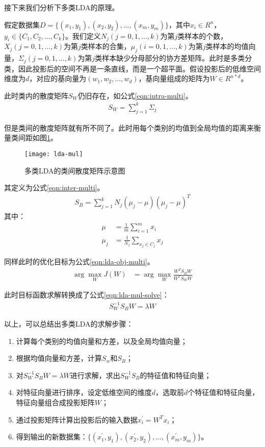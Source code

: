 接下来我们分析下多类LDA的原理。

假定数据集$D=\{(x_1, y_1), (x_2, y_2), ..., (x_m, y_m)\}$，其中$x_i \in R^{n}$，$y_i \in \{C_1, C_2, ..., C_k\}$。我们定义$N_j (j=0,1,...,k)$为第$j$类样本的个数，$X_j (j=0,1,...,k)$为第$j$类样本的合集，$\mu_j (i=0,1,...,k)$为第$j$类样本的均值向量，$\Sigma_j (j=0,1,...,k)$为第$j$类样本缺少分母部分的协方差矩阵。此时是多类分类，因此投影后的空间不再是一条直线，而是一个超平面。假设投影后的低维空间维度为$d$，对应的基向量为$(w_1, w_2,..., w_d)$，基向量组成的矩阵为$W\in{R^{n*d}}$。

此时类内的散度矩阵$S_W$仍旧存在，如公式\ref{eqn:intra-multi}。
\begin{align}
\label{eqn:intra-multi}
S_W = \sum_{j=1}^{k} \Sigma_{j} 
\end{align}

但是类间的散度矩阵就有所不同了。此时用每个类别的均值到全局均值的距离来衡量类间距如图\ref{fig:lda-mul}。
\begin{figure}[htbp]
  \centering
  \texttt{[image: lda-mul]}
  \caption{多类LDA的类间散度矩阵示意图 \label{fig:lda-mul}}
\end{figure}

其定义为公式\ref{eqn:inter-multi}。
\begin{align}
\label{eqn:inter-multi}
S_B = \sum_{j=1}^{k} N_j (\mu_{j} - \mu)(\mu_{j} -\mu)^{T}
\end{align}
其中：
\begin{align}
\mu     &= \frac{1}{m}\sum_{i=1}^{m} x_{i} \\
\mu_{j} &= \frac{1}{N_{j}}\sum_{x_{j}\in{C_{j}}} x_{j}
\end{align}

同样此时的优化目标为公式\ref{eqn:lda-obj-multi}。
\begin{align}
\label{eqn:lda-obj-multi}
\arg\mathop{\max}_{W} J(W)  &= \arg\mathop{\max}_{W} \frac{W^{T}S_{B}W}{W^{T}S_{W}W} 
\end{align}

此时目标函数求解转换成了公式\ref{eqn:lda-mul-solve}：
\begin{align}
\label{eqn:lda-mul-solve}
S_{W}^{-1}S_{B}W = \lambda{W}
\end{align}

以上，可以总结出多类LDA的求解步骤：
\begin{enumerate}
  \item 计算每个类别的均值向量和方差，以及全局均值向量；
  \item 根据均值向量和方差，计算$S_w$和$S_B$；
  \item 对$S_{W}^{-1}S_{B}W = \lambda{W}$进行求解，求出$S_{W}^{-1}S_{B}$的特征值和特征向量；
  \item 对特征向量进行排序，设定低维空间的维度$d$，选取前$d$个特征值和特征向量，特征向量组合成投影矩阵$W$；
  \item 通过投影矩阵计算出投影后的输入数据$x_{i}^{'}=W^{T}x_{i}$；
  \item 得到输出的新数据集：$\{(x_{1}^{'}, y_1), (x_{2}^{'}, y_2), ..., (x_{m}^{'}, y_m)\}$。
\end{enumerate}

